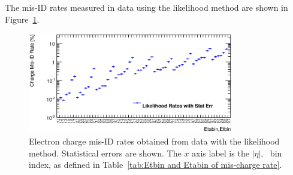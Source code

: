 %



The mis-ID rates measured in data using the likelihood method are shown in Figure~\ref{fig:LL_Rates_Egamma}.

%



\begin{figure}[htp]
\centering
\includegraphics[width=0.8\textwidth]{figures/ChargeMisID/Egamma_LLB_new.eps}
\caption{Electron charge mis-ID rates obtained from data with the likelihood method. Statistical errors are shown. The $x$ axis label is
  the $|\eta|$, \pt\ bin index, as defined in Table~\ref{tab:Etbin and Etabin of mis-charge rate}.}

\label{fig:LL_Rates_Egamma}
\end{figure}


